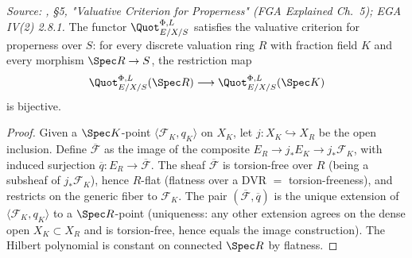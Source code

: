 \begin{lemma}
  \label{lem:quot_valuative_criterion}
  \textit{Source: \cite{nitsure-hilbert-quot}, \S 5, "Valuative Criterion for Properness"
  (FGA Explained Ch.~5); EGA IV(2) 2.8.1.}
  The functor \(\Quot^{\Phi,L}_{E/X/S}\) satisfies the valuative criterion
  for properness over \(S\): for every discrete valuation ring \(R\) with
  fraction field \(K\) and every morphism \(\Spec R \to S\), the restriction
  map
  \[
    \Quot^{\Phi,L}_{E/X/S}(\Spec R)
    \longrightarrow
    \Quot^{\Phi,L}_{E/X/S}(\Spec K)
  \]
  is bijective.
\end{lemma}

\begin{proof}

  Given a \(\Spec K\)-point \(\langle \mathcal{F}_K, q_K\rangle\) on \(X_K\),
  let \(j : X_K \hookrightarrow X_R\) be the open inclusion. Define
  \(\overline{\mathcal{F}}\) as the image of the composite
  \(E_R \to j_* E_K \to j_* \mathcal{F}_K\), with induced surjection
  \(\overline{q} : E_R \to \overline{\mathcal{F}}\). The sheaf
  \(\overline{\mathcal{F}}\) is torsion-free over \(R\) (being a subsheaf of
  \(j_* \mathcal{F}_K\)), hence \(R\)-flat (flatness over a DVR
  \(=\) torsion-freeness), and restricts on the generic fiber to
  \(\mathcal{F}_K\). The pair \((\overline{\mathcal{F}}, \overline{q})\) is
  the unique extension of \(\langle \mathcal{F}_K, q_K\rangle\) to a
  \(\Spec R\)-point (uniqueness: any other extension agrees on the dense
  open \(X_K \subset X_R\) and is torsion-free, hence equals the image
  construction). The Hilbert polynomial is constant on connected
  \(\Spec R\) by flatness.
\end{proof}

